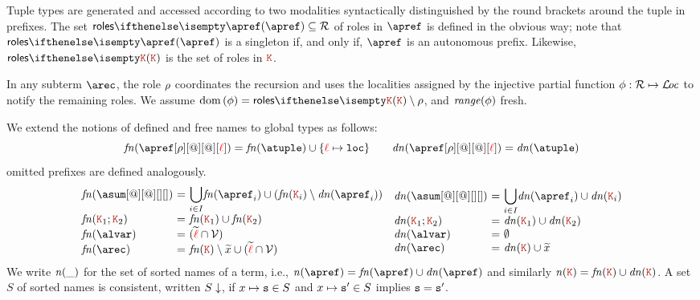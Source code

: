 Tuple types are generated and accessed according to two modalities
syntactically distinguished by the round brackets around the tuple
in prefixes.
%
The set $\roles \apref \subseteq \roleset$ of roles in $\apref$ is
defined in the obvious way; note that $\roles \apref$ is a singleton
if, and only if, $\apref$ is an autonomous prefix.
%
Likewise, $\roles \aK$ is the set of roles in
$\aK$.

In any subterm $\arec$,  the role $\rho$ coordinates the recursion and uses 
the localities assigned by the injective partial function $\phi:\mathcal{R}\mapsto \mathcal{L}\!\mathit{oc}$  to notify the 
remaining roles. We assume $\dom(\phi) = \roles \aK \setminus \arole$, 
and ${\it range}(\phi)$ fresh.

We extend the notions of defined and free names to global types as
follows:
\[
 \fn{\apref[\arole][@][@][\alocvar]}
 = \fn \atuple \cup \{\alocvar \mapsto \asort[loc]\} 
\qquad
 \dn{\apref[\arole][@][@][\alocvar]} 
 = \dn \atuple 
\]
omitted prefixes are defined analogously.
\[
  \begin{array}{ll}
    \begin{array}{l@{\ =\ } ll}
      \fn{\asum[@][@][][]} & \displaystyle{\bigcup_{i\in I}} \fn{\apref_i} \cup (\fn{\aK_i}\setminus\dn{\apref_i})
      \\
      \fn{\aK_1; \aK_2} 
                &
                  \fn{\aK_1}\cup\fn{\aK_2}
      \\
      \fn \alvar & (\seq \alocvar \cap \varset)
      \\
      \fn \arec & \fn {\aK} \setminus \seq x \cup (\seq \alocvar \cap \varset)
    \end{array}
    \begin{array}{l@{\ =\ } ll}
      \dn{\asum[@][@][][]} & \displaystyle{\bigcup_{i\in I}} \dn{\apref_i} \cup \dn{\aK_i}
      \\
      \dn{\aK_1; \aK_2} 
                           &
                             \dn{\aK_1}\cup\dn{\aK_2}
      \\
      \dn \alvar & \emptyset
      \\
      \dn \arec & \dn {\aK} \cup \seq x
    \end{array}
  \end{array}
\]
%
We write ${\it n}(\_)$ for the set of sorted names of a term, i.e.,
$\names \apref = \fn\apref \cup \dn\apref$ and similarly
$\names \aK = \fn\aK \cup \dn\aK$. A set $S$ of sorted names is
consistent, written $S\downarrow$, if $x\mapsto \mathtt{s} \in S$ and
$x\mapsto \mathtt{s}' \in S$ implies $\mathtt{s} = \mathtt{s}'$.
 
